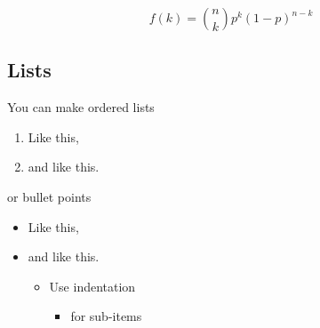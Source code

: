 \documentclass[9pt,a4paper,]{extarticle}
\theoremstyle{definition}
\theoremstyle{definition}
\theoremstyle{remark}
\begin{document}
\begin{equation}
  f\left(k\right) = \binom{n}{k} p^k\left(1-p\right)^{n-k}
  \label{eq:binom}
\end{equation}

\subsection{Lists}\label{lists}

You can make ordered lists

\begin{enumerate}
\def\labelenumi{\arabic{enumi}.}
\item
  Like this,
\item
  and like this.
\end{enumerate}

or bullet points

\begin{itemize}
\item
  Like this,
\item
  and like this.

  \begin{itemize}
  \item
    Use indentation

    \begin{itemize}
    \item
      for sub-items
    \end{itemize}
  \end{itemize}
\end{itemize}
\end{document}
